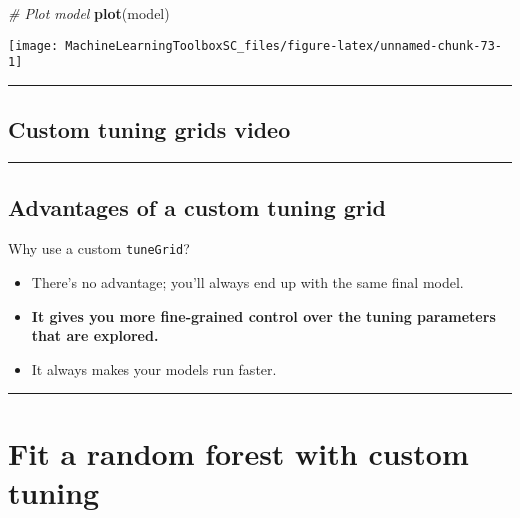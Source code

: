 \documentclass[
]{book}
\newenvironment{Shaded}{\begin{snugshade}}{\end{snugshade}}
\newcommand{\CommentTok}[1]{\textcolor[rgb]{0.56,0.35,0.01}{\textit{#1}}}
\newcommand{\KeywordTok}[1]{\textcolor[rgb]{0.13,0.29,0.53}{\textbf{#1}}}
\newcommand{\NormalTok}[1]{#1}
\begin{document}
\begin{Shaded}
\begin{Highlighting}[]
\CommentTok{# Plot model}
\KeywordTok{plot}\NormalTok{(model)}
\end{Highlighting}
\end{Shaded}

\begin{center}\texttt{[image: MachineLearningToolboxSC\_files/figure-latex/unnamed-chunk-73-1]} \end{center}

\begin{center}\rule{0.5\linewidth}{0.5pt}\end{center}

\hypertarget{custom-tuning-grids-video}{%
\subsection*{Custom tuning grids video}\label{custom-tuning-grids-video}}

\begin{center}\rule{0.5\linewidth}{0.5pt}\end{center}

\hypertarget{advantages-of-a-custom-tuning-grid}{%
\subsection*{Advantages of a custom tuning grid}\label{advantages-of-a-custom-tuning-grid}}

Why use a custom \texttt{tuneGrid}?

\begin{itemize}
\item
  There's no advantage; you'll always end up with the same final model.
\item
  \textbf{It gives you more fine-grained control over the tuning parameters that are explored.}
\item
  It always makes your models run faster.
\end{itemize}

\begin{center}\rule{0.5\linewidth}{0.5pt}\end{center}

\hypertarget{fit-a-random-forest-with-custom-tuning}{%
\section{Fit a random forest with custom tuning}\label{fit-a-random-forest-with-custom-tuning}}
\end{document}
